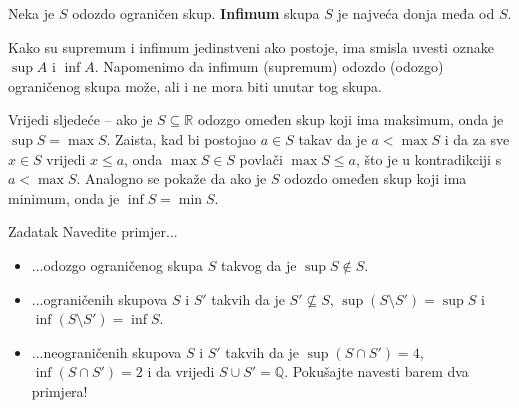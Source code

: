 \begin{definition}
Neka je \(S\) odozdo ograničen skup. \textbf{Infimum} skupa \(S\) je najveća donja međa od \(S\).
\end{definition}

Kako su supremum i infimum jedinstveni ako postoje, ima smisla uvesti oznake \(\sup{A}\) i \(\inf{A}\).
Napomenimo da infimum (supremum) odozdo (odozgo) ograničenog skupa može, ali i ne mora biti unutar tog skupa. 
\begin{remark}
\label{supmax}
Vrijedi sljedeće -- ako je \(S\subseteq \mathbb{R}\) odozgo omeđen skup koji ima maksimum, onda je \(\sup{S}=\max{S}\). Zaista, kad bi postojao \(a\in S\) takav da je \(a<\max{S}\) i da za sve \(x\in S\) vrijedi \(x\leq a\), onda \(\max{S}\in S\) povlači \(\max{S}\leq a\), što je u kontradikciji s \(a<\max{S}\). Analogno se pokaže da ako je \(S\) odozdo omeđen skup koji ima minimum, onda je \(\inf{S}=\min{S}\).
\end{remark}
\begin{exercise}{Zadatak} Navedite primjer...
\begin{itemize}
\item[a)] ...odozgo ograničenog skupa $S$ takvog da je $\sup{S}\notin S$.
\item[b)] ...ograničenih skupova $S$ i $S'$ takvih da je $S'\not\subseteq S$, $\sup{\left(S\setminus S'\right)}=\sup{S}$ i $\inf{\left(S\setminus S'\right)}=\inf{S}$.
\item[c)] ...neograničenih skupova $S$ i $S'$ takvih da je $\sup{\left(S\cap S'\right)}=4$, $\inf{\left(S\cap S'\right)}=2$ i da vrijedi $S\cup S'=\mathbb{Q}$. Pokušajte navesti barem dva primjera!
\end{itemize}
\end{exercise}
